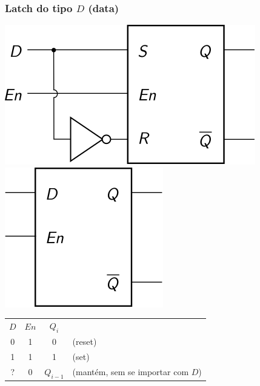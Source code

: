 \documentclass{beamer}
\begin{document}
\begin{frame}
\frametitle{Latch do tipo $D$ (data)}

\hspace*{\fill}
\includegraphics{images/latchD}%
\hspace*{\fill}\pause%
\raisebox{40pt}{\Huge=}%
\hspace*{\fill}\pause%
\includegraphics{images/latchD_blackbox}%
\hspace*{\fill}

\vspace{12pt}

\pause

\begin{center}
\begin{tabular}{cc||cl}
$D$ & $En$ & $Q_i$  \\
\cline{1-3}
 0  &   1  &   0   & (reset) \\
 1  &   1  &   1   & (set) \\
 ?  &   0  & $Q_{i-1}$ & (mantém, sem se importar com $D$) \\
\end{tabular}
\end{center}

\end{frame}
\end{document}
